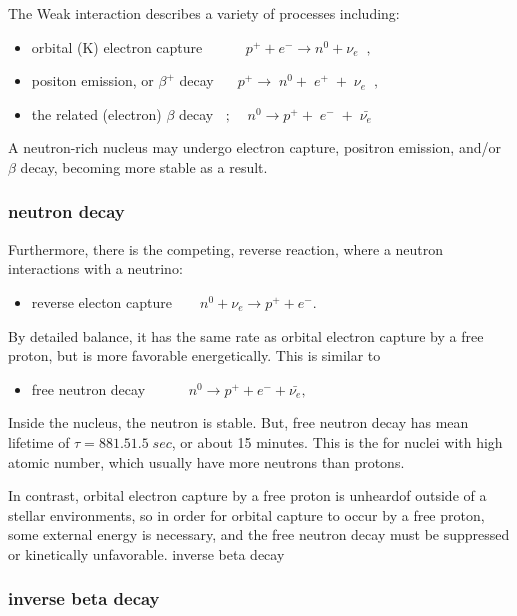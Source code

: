 \documentclass[11pt]{amsart}
\begin{document}
The Weak interaction describes a variety of processes including:
\begin{itemize}
\item orbital (K) electron capture $\;\;\;\;\;\;\;\;\;\;p^{+}+e^{-} \rightarrow n^{0}+\nu_{e}\;\;,$

\item positon emission, or $\beta^{+}$ decay $\;\;\;\;\;p^{+}\rightarrow\;n^{0}+\;e^{+}\;+\;\nu_{e}\;\;,$

\item the related (electron) $\beta$ decay $\;\;;\;\;\;\;n^{0}\rightarrow p^{+}+\;e^{-}\;+\;\bar{\nu_{e}}$
\end{itemize}


A neutron-rich nucleus may undergo electron capture, positron emission, and/or $\beta$ decay, becoming more stable as a result.

\subsubsection{neutron decay}
Furthermore, there is the competing, reverse reaction, where a neutron interactions with a neutrino:
\begin{itemize}
\item reverse electon capture  $\;\;\;\;\;\;n^{0}+\nu_{e}\rightarrow p^{+}+e^{-}$.
\end{itemize}

By detailed balance, it has the same rate as orbital electron capture by a free proton, but is more favorable energetically.
This is similar to
\begin{itemize}
\item free neutron decay  $\;\;\;\;\;\;\;\;\;\;n^{0}\rightarrow p^{+}+e^{-}+\bar{\nu_{e}},$
\end{itemize}

Inside the nucleus, the neutron is stable. But, free neutron decay has mean lifetime of $\tau=881.5 1.5\;sec $, or about 15 minutes.
This is the for nuclei with high atomic number, which usually have more neutrons than protons.

In contrast, orbital electron capture by a free proton is unheardof outside of a stellar environments, so in order for orbital capture to occur by a free proton, some external energy is necessary, and the free neutron decay must be suppressed or kinetically unfavorable.
inverse beta decay

\subsubsection{inverse beta decay}
\end{document}
